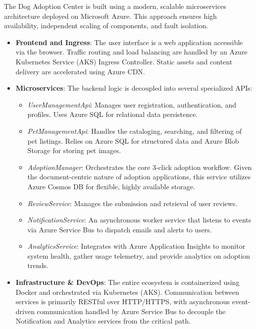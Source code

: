 The Dog Adoption Center is built using a modern, scalable microservices architecture deployed on Microsoft Azure. This approach ensures high availability, independent scaling of components, and fault isolation.

\begin{itemize}
    \item \textbf{Frontend and Ingress}: The user interface is a web application accessible via the browser. Traffic routing and load balancing are handled by an Azure Kubernetes Service (AKS) Ingress Controller. Static assets and content delivery are accelerated using Azure CDN.
    
    \item \textbf{Microservices}: The backend logic is decoupled into several specialized APIs:
    \begin{itemize}
        \item \textit{UserManagementApi}: Manages user registration, authentication, and profiles. Uses Azure SQL for relational data persistence.
        \item \textit{PetManagementApi}: Handles the cataloging, searching, and filtering of pet listings. Relies on Azure SQL for structured data and Azure Blob Storage for storing pet images.
        \item \textit{AdoptionManager}: Orchestrates the core 3-click adoption workflow. Given the document-centric nature of adoption applications, this service utilizes Azure Cosmos DB for flexible, highly available storage.
        \item \textit{ReviewService}: Manages the submission and retrieval of user reviews. 
        \item \textit{NotificationService}: An asynchronous worker service that listens to events via Azure Service Bus to dispatch emails and alerts to users.
        \item \textit{AnalyticsService}: Integrates with Azure Application Insights to monitor system health, gather usage telemetry, and provide analytics on adoption trends.
    \end{itemize}
    
    \item \textbf{Infrastructure \& DevOps}: The entire ecosystem is containerized using Docker and orchestrated via Kubernetes (AKS). Communication between services is primarily RESTful over HTTP/HTTPS, with asynchronous event-driven communication handled by Azure Service Bus to decouple the Notification and Analytics services from the critical path.
\end{itemize}
